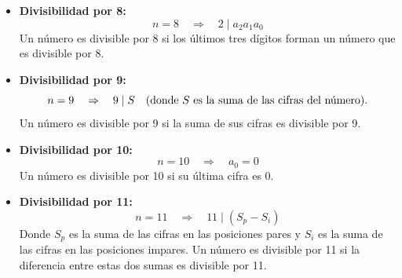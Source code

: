 \documentclass{article}
\begin{document}
\begin{itemize}
    \item \textbf{Divisibilidad por 8:} 
    $$n = 8 \quad \Rightarrow \quad 2 \mid a_2 a_1 a_0$$
    Un número es divisible por 8 si los últimos tres dígitos forman un número que es divisible por 8.

    \item \textbf{Divisibilidad por 9:} 
    $$n = 9 \quad \Rightarrow \quad 9 \mid S \quad \text{(donde $ S $ es la suma de las cifras del número).}$$
    Un número es divisible por 9 si la suma de sus cifras es divisible por 9.

    \item \textbf{Divisibilidad por 10:} 
    $$n = 10 \quad \Rightarrow \quad a_0 = 0$$
    Un número es divisible por 10 si su última cifra es 0.

    \item \textbf{Divisibilidad por 11:} 
    $$n = 11 \quad \Rightarrow \quad 11 \mid (S_p - S_i)$$
    Donde $ S_p $ es la suma de las cifras en las posiciones pares y $ S_i $ es la suma de las cifras en las posiciones impares. Un número es divisible por 11 si la diferencia entre estas dos sumas es divisible por 11.
\end{itemize}

\end{document}
